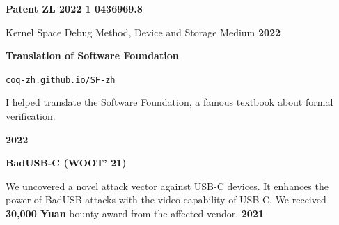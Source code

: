 \documentclass{resume}
\begin{document}
\begin{content}
	{\bf Patent ZL 2022 1 0436969.8}

	{Kernel Space Debug Method, Device and Storage Medium}
	\hfill {\bf 2022}

	{\bf Translation of Software Foundation} \enspace
	{\href{https://coq-zh.github.io/SF-zh/}{\texttt{coq-zh.github.io/SF-zh}}

		{I helped translate the Software Foundation, a famous textbook
			about formal verification.}}
	\hfill {\bf 2022}

	{\bf \textbf{BadUSB-C} (WOOT' 21)}

	{We uncovered a novel attack vector against USB-C devices. It enhances the power of BadUSB attacks with the video capability of USB-C. We received \textbf{30,000 Yuan} bounty award from the affected vendor.}
	\hfill {\bf 2021}


	\sectionlineskip
\end{content}
\end{document}
